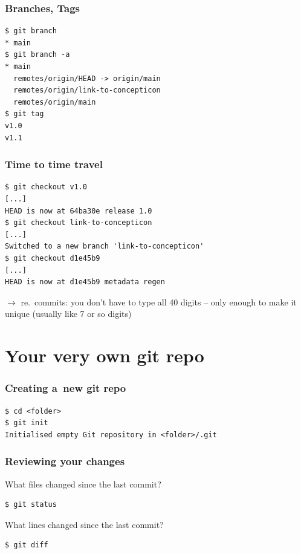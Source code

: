 \documentclass[12pt]{beamer}
\begin{document}
\begin{frame}[fragile]
  \frametitle{Branches, Tags}

  {\footnotesize{}%
    \begin{verbatim}
$ git branch
* main
$ git branch -a
* main
  remotes/origin/HEAD -> origin/main
  remotes/origin/link-to-concepticon
  remotes/origin/main
$ git tag
v1.0
v1.1
    \end{verbatim}%
  }
\end{frame}

\begin{frame}[fragile]
  \frametitle{Time to time travel}

  {\footnotesize{}%
    \begin{verbatim}
$ git checkout v1.0
[...]
HEAD is now at 64ba30e release 1.0
$ git checkout link-to-concepticon
[...]
Switched to a new branch 'link-to-concepticon'
$ git checkout d1e45b9
[...]
HEAD is now at d1e45b9 metadata regen
    \end{verbatim}
  }
  $\to$ re.\ commits: you don't have to type all 40 digits -- only enough
  to make it unique (usually like 7 or so digits)
\end{frame}


\section{Your very own git repo}

\begin{frame}[fragile]
  \frametitle{Creating a~new git repo}

  {\footnotesize{}%
    \begin{verbatim}
$ cd <folder>
$ git init
Initialised empty Git repository in <folder>/.git
    \end{verbatim}%
  }
\end{frame}

\begin{frame}[fragile]
  \frametitle{Reviewing your changes}

  \begin{block}{What files changed since the last commit?}
    {\footnotesize{}%
      \begin{verbatim}
$ git status
      \end{verbatim}%
    }
  \end{block}

  \begin{block}{What lines changed since the last commit?}
    {\footnotesize{}%
      \begin{verbatim}
$ git diff
      \end{verbatim}%
    }
  \end{block}
\end{frame}
\end{document}
